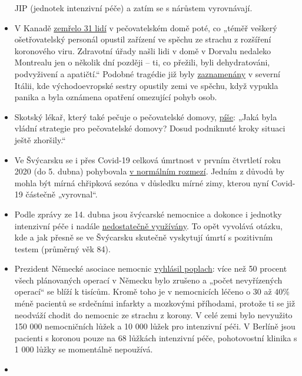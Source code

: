 \begin{itemize}
  JIP (jednotek intenzivní péče) a zatím se s nárůstem vyrovnávají.
\item
  V Kanadě
  \href{https://www.nytimes.com/2020/04/16/world/canada/montreal-nursing-homes-coronavirus.html}{zemřelo
  31 lidí} v pečovatelském domě poté, co „téměř veškerý ošetřovatelský
  personál opustil zařízení ve spěchu ze strachu z rozšíření koronového
  viru. Zdravotní úřady našli lidi v domě v Dorvalu nedaleko Montrealu
  jen o několik dní později -- ti, co přežili, byli dehydratováni,
  podvyživení a apatičtí.`` Podobné tragédie již byly
  \href{https://swprs.org/covid-19-a-report-from-italy/}{zaznamenány} v
  severní Itálii, kde východoevropské sestry opustily zemi ve spěchu,
  když vypukla panika a byla oznámena opatření omezující pohyb osob. 
\item
  Skotský lékař, který také pečuje o pečovatelské domovy,
  \href{https://drmalcolmkendrick.org/2020/04/17/care-homes-and-covid19/}{píše}:
  „Jaká byla vládní strategie pro pečovatelské domovy? Dosud podniknuté
  kroky situaci ještě zhoršily.``
\item
  Ve Švýcarsku se i přes Covid-19 celková úmrtnost v prvním čtvrtletí
  roku 2020 (do 5. dubna) pohybovala
  \href{https://swprs.files.wordpress.com/2020/04/ch-sterblichkeit-kumuliert-q1-2020.pdf}{v
  normálním rozmezí}. Jedním z důvodů by mohla být mírná chřipková
  sezóna v důsledku mírné zimy, kterou nyní Covid-19 částečně
  „vyrovnal``.
\item
  Podle zprávy ze 14. dubna jsou švýcarské nemocnice a dokonce i
  jednotky intenzivní péče i nadále
  \href{https://swprs.files.wordpress.com/2020/04/intensivbettenbelegung-schweiz-2020-04-14.png}{nedostatečně
  využívány}. To opět vyvolává otázku, kde a jak přesně se ve Švýcarsku
  skutečně vyskytují úmrtí s pozitivním testem (průměrný věk 84).
\item
  Prezident Německé asociace nemocnic
  \href{https://www.bz-berlin.de/deutschland/kliniken-verband-schlaegt-alarm-wegen-corona-regeln}{vyhlásil
  poplach}: více než 50 procent všech plánovaných operací v Německu bylo
  zrušeno a „počet nevyřízených operací`` se blíží k tisícům. Kromě toho
  je v nemocnicích léčeno o 30 až 40\% méně pacientů se srdečními
  infarkty a mozkovými příhodami, protože ti se již neodváží chodit do
  nemocnic ze strachu z korony. V celé zemi bylo nevyužito 150 000
  nemocničních lůžek a 10 000 lůžek pro intenzivní péči. V Berlíně jsou
  pacienti s koronou pouze na 68 lůžkách intenzivní péče, pohotovostní
  klinika s 1 000 lůžky se momentálně nepoužívá.
\item

\end{itemize}
